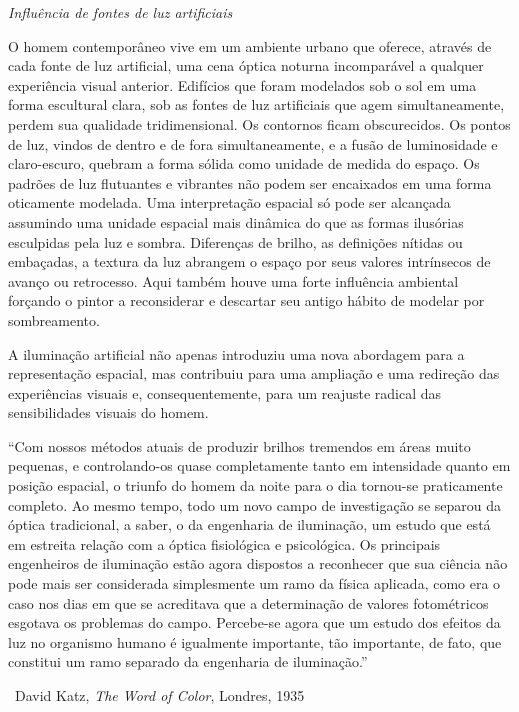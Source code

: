 \documentclass[a4paper]{article}
\begin{document}
\begin{center}\textit{\large Influência de fontes de luz artificiais}\end{center}

O homem contemporâneo vive em um ambiente urbano que oferece, através de cada fonte de luz artificial, uma cena óptica noturna incomparável a qualquer experiência visual anterior. Edifícios que foram modelados sob o sol em uma forma escultural clara, sob as fontes de luz artificiais que agem simultaneamente, perdem sua qualidade tridimensional. Os contornos ficam obscurecidos. Os pontos de luz, vindos de dentro e de fora simultaneamente, e a fusão de luminosidade e claro-escuro, quebram a forma sólida como unidade de medida do espaço. Os padrões de luz flutuantes e vibrantes não podem ser encaixados em uma forma oticamente modelada. Uma interpretação espacial só pode ser alcançada assumindo uma unidade espacial mais dinâmica do que as formas ilusórias esculpidas pela luz e sombra. Diferenças de brilho, as definições nítidas ou embaçadas, a textura da luz abrangem o espaço por seus valores intrínsecos de avanço ou retrocesso. Aqui também houve uma forte influência ambiental forçando o pintor a reconsiderar e descartar seu antigo hábito de modelar por sombreamento.

A iluminação artificial não apenas introduziu uma nova abordagem para a representação espacial, mas contribuiu para uma ampliação e uma redireção das experiências visuais e, consequentemente, para um reajuste radical das sensibilidades visuais do homem.

``Com nossos métodos atuais de produzir brilhos tremendos em áreas muito pequenas, e controlando-os quase completamente tanto em intensidade quanto em posição espacial, o triunfo do homem da noite para o dia tornou-se praticamente completo. Ao mesmo tempo, todo um novo campo de investigação se separou da óptica tradicional, a saber, o da engenharia de iluminação, um estudo que está em estreita relação com a óptica fisiológica e psicológica. Os principais engenheiros de iluminação estão agora dispostos a reconhecer que sua ciência não pode mais ser considerada simplesmente um ramo da física aplicada, como era o caso nos dias em que se acreditava que a determinação de valores fotométricos esgotava os problemas do campo. Percebe-se agora que um estudo dos efeitos da luz no organismo humano é igualmente importante, tão importante, de fato, que constitui um ramo separado da engenharia de iluminação.''

\vspace{1em}
\noindent \textbullet \ David Katz, \textit{The Word of Color}, Londres, 1935
\end{document}
